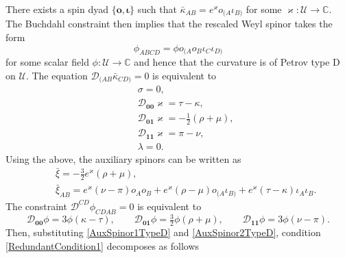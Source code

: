 \documentclass[10pt,a4paper]{article}
\newcommand\omicron{o}
\theoremstyle{plain}
\begin{document}
There exists a spin dyad $\lbrace \bm\omicron, \bm\iota\rbrace$ such that $\bar{\kappa}_{AB} = e^{\varkappa} \omicron_{(A}\iota_{B)}$ for some $\varkappa:\mathcal{U}\rightarrow\mathbb{C}$. The Buchdahl constraint then implies that the rescaled Weyl spinor takes the form
\[ \phi_{ABCD}= \phi \omicron_{(A}\omicron_B\iota_C\iota_{D)}\]
for some scalar field $\phi:\mathcal{U}\rightarrow\mathbb{C}$ and hence that the curvature is of Petrov type D on $\mathcal{U}$. The equation $\mathcal{D}_{(AB}\bar{\kappa}_{CD)}=0$ is equivalent to 
\begin{subequations}
\begin{eqnarray}
&& \sigma=0,\label{SpatialSenTypeD0000}\\
&& \mathcal{D}_{\bm0\bm0}\varkappa = \tau - \kappa, \label{SpatialSenTypeD0001}\\
&& \mathcal{D}_{\bm0\bm1}\varkappa = -\tfrac{1}{2} (\rho+\mu),\label{SpatialSenTypeD0011}\\
&& \mathcal{D}_{\bm1\bm1}\varkappa = \pi - \nu, \label{SpatialSenTypeD0111}\\
&& \lambda = 0.\label{SpatialSenTypeD1111}
\end{eqnarray}
\end{subequations}
Using the above, the auxiliary spinors can be written as 
\begin{subequations}
\begin{eqnarray} 
&& \bar{\xi} =-\tfrac{3}{2}e^{\varkappa}(\rho+\mu), \label{AuxSpinor1TypeD}\\
&& \bar{\xi}_{AB} = e^{\varkappa} (\nu - \pi) o_{A} o_{B} + e^{\varkappa}(\rho-\mu) o_{(A}\iota_{B)} + e^{\varkappa} (\tau - \kappa) \iota_{A} \iota_{B}. \label{AuxSpinor2TypeD}
\end{eqnarray}
\end{subequations}
The constraint $\mathcal{D}^{CD}\phi_{CDAB}=0$ is equivalent to 
\begin{equation}\label{WeylConstraintTypeD}
  \mathcal{D}_{\bm0\bm0}\phi = 3 \phi(\kappa - \tau), \qquad 
  \mathcal{D}_{\bm0\bm1}\phi = \tfrac{3}{2}\phi(\rho + \mu), \qquad
  \mathcal{D}_{\bm1\bm1}\phi = 3\phi (\nu  - \pi). 
\end{equation}
Then, substituting \eqref{AuxSpinor1TypeD} and \eqref{AuxSpinor2TypeD}, condition \eqref{RedundantCondition1} decomposes as follows
\end{document}
